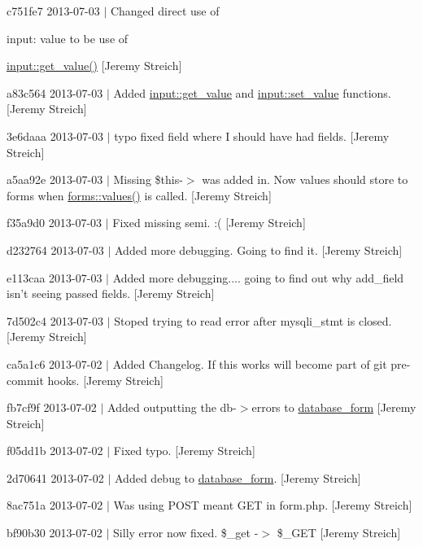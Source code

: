 \begin{DoxyItemize}
\item c751fe7 2013-\/07-\/03 $|$ Changed direct use of \begin{DoxyParagraph}{input\-:}
value to be use of 
\end{DoxyParagraph}
\hyperlink{classinput_a1b3bcdbb596a1154a944a169ac67f547}{input\-::get\-\_\-value()} \mbox{[}Jeremy Streich\mbox{]}
\item a83c564 2013-\/07-\/03 $|$ Added \hyperlink{classinput_a1b3bcdbb596a1154a944a169ac67f547}{input\-::get\-\_\-value} and \hyperlink{classinput_a2383e00d55bf3dbcc7071b2fe1336aec}{input\-::set\-\_\-value} functions. \mbox{[}Jeremy Streich\mbox{]}
\item 3e6daaa 2013-\/07-\/03 $|$ typo fixed field where I should have had fields. \mbox{[}Jeremy Streich\mbox{]}
\item a5aa92e 2013-\/07-\/03 $|$ Missing \$this-\/$>$ was added in. Now values should store to forms when \hyperlink{classforms_ad66e3f3a4d5332bbd15e53680930d786}{forms\-::values()} is called. \mbox{[}Jeremy Streich\mbox{]}
\item f35a9d0 2013-\/07-\/03 $|$ Fixed missing semi. \-:( \mbox{[}Jeremy Streich\mbox{]}
\item d232764 2013-\/07-\/03 $|$ Added more debugging. Going to find it. \mbox{[}Jeremy Streich\mbox{]}
\item e113caa 2013-\/07-\/03 $|$ Added more debugging.... going to find out why add\-\_\-field isn't seeing passed fields. \mbox{[}Jeremy Streich\mbox{]}
\item 7d502c4 2013-\/07-\/03 $|$ Stoped trying to read error after mysqli\-\_\-stmt is closed. \mbox{[}Jeremy Streich\mbox{]}
\item ca5a1c6 2013-\/07-\/02 $|$ Added Changelog. If this works will become part of git pre-\/commit hooks. \mbox{[}Jeremy Streich\mbox{]}
\item fb7cf9f 2013-\/07-\/02 $|$ Added outputting the db-\/$>$errors to \hyperlink{classdatabase__form}{database\-\_\-form} \mbox{[}Jeremy Streich\mbox{]}
\item f05dd1b 2013-\/07-\/02 $|$ Fixed typo. \mbox{[}Jeremy Streich\mbox{]}
\item 2d70641 2013-\/07-\/02 $|$ Added debug to \hyperlink{classdatabase__form}{database\-\_\-form}. \mbox{[}Jeremy Streich\mbox{]}
\item 8ac751a 2013-\/07-\/02 $|$ Was using P\-O\-S\-T meant G\-E\-T in form.\-php. \mbox{[}Jeremy Streich\mbox{]}
\item bf90b30 2013-\/07-\/02 $|$ Silly error now fixed. \$\-\_\-get -\/$>$ \$\-\_\-\-G\-E\-T \mbox{[}Jeremy Streich\mbox{]}

\end{DoxyItemize}
